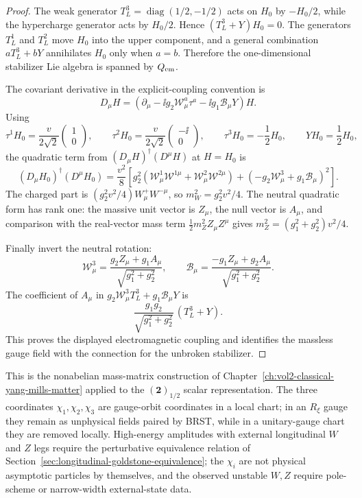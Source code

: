 \begin{proof}
The weak generator \(T^3_L=\operatorname{diag}(1/2,-1/2)\) acts on
\(H_0\) by \(-H_0/2\), while the hypercharge generator acts by
\(H_0/2\).  Hence \((T^3_L+Y)H_0=0\).  The generators \(T^1_L\) and
\(T^2_L\) move \(H_0\) into the upper component, and a general combination
\(aT^3_L+bY\) annihilates \(H_0\) only when \(a=b\).  Therefore the
one-dimensional stabilizer Lie algebra is spanned by \(Q_{\rm em}\).

The covariant derivative in the explicit-coupling convention is
\[
  D_\mu H
  =
  \left(
    \partial_\mu-\ii g_2\mathcal W^a_\mu\tau^a-\ii g_1\mathcal B_\mu Y
  \right)H .
\]
Using
\[
  \tau^1H_0=\frac{v}{2\sqrt2}\begin{pmatrix}1\\0\end{pmatrix},
  \qquad
  \tau^2H_0=\frac{v}{2\sqrt2}\begin{pmatrix}-\ii\\0\end{pmatrix},
  \qquad
  \tau^3H_0=-\frac12H_0,
  \qquad
  YH_0=\frac12H_0 ,
\]
the quadratic term from \((D_\mu H)^\dagger(D^\mu H)\) at \(H=H_0\) is
\[
  (D_\mu H_0)^\dagger(D^\mu H_0)
  =
  \frac{v^2}{8}
  \left[
    g_2^2(\mathcal W^1_\mu\mathcal W^{1\mu}
          +\mathcal W^2_\mu\mathcal W^{2\mu})
    +(-g_2\mathcal W^3_\mu+g_1\mathcal B_\mu)^2
  \right].
\]
The charged part is
\((g_2^2v^2/4)W^+_\mu W^{-\mu}\), so
\(m_W^2=g_2^2v^2/4\).  The neutral quadratic form has rank one: the massive
unit vector is \(Z_\mu\), the null vector is \(A_\mu\), and comparison with
the real-vector mass term \(\frac12m_Z^2Z_\mu Z^\mu\) gives
\(m_Z^2=(g_1^2+g_2^2)v^2/4\).

Finally invert the neutral rotation:
\[
  \mathcal W^3_\mu
  =
  \frac{g_2Z_\mu+g_1A_\mu}{\sqrt{g_1^2+g_2^2}},
  \qquad
  \mathcal B_\mu
  =
  \frac{-g_1Z_\mu+g_2A_\mu}{\sqrt{g_1^2+g_2^2}} .
\]
The coefficient of \(A_\mu\) in
\(g_2\mathcal W^3_\mu T^3_L+g_1\mathcal B_\mu Y\) is
\[
  \frac{g_1g_2}{\sqrt{g_1^2+g_2^2}}\,(T^3_L+Y).
\]
This proves the displayed electromagnetic coupling and identifies the
massless gauge field with the connection for the unbroken stabilizer.
\end{proof}

This is the nonabelian mass-matrix construction of
Chapter~\ref{ch:vol2-classical-yang-mills-matter} applied to the
\((\mathbf2)_{1/2}\) scalar representation.  The three coordinates
\(\chi_1,\chi_2,\chi_3\) are gauge-orbit coordinates in a local chart; in an
\(R_\xi\) gauge they remain as unphysical fields paired by BRST, while in a
unitary-gauge chart they are removed locally.  High-energy amplitudes with
external longitudinal \(W\) and \(Z\) legs require the perturbative equivalence
relation of
Section~\ref{sec:longitudinal-goldstone-equivalence}; the \(\chi_i\) are not
physical asymptotic particles by themselves, and the observed unstable
\(W,Z\) require pole-scheme or narrow-width external-state data.

